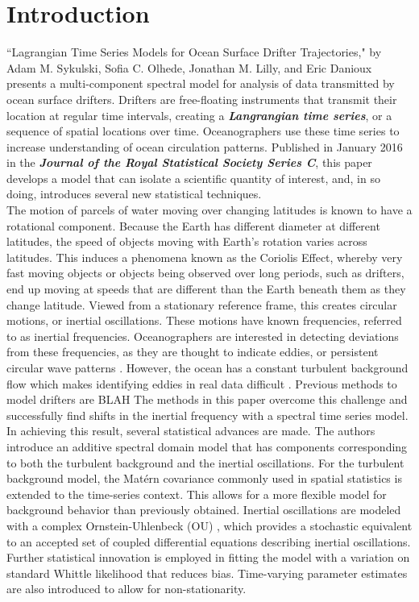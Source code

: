\documentclass{stat572Style}
\begin{document}
\section{Introduction}
\indent ``Lagrangian Time Series Models for Ocean Surface Drifter Trajectories," by Adam M. Sykulski, Sofia C. Olhede, Jonathan M. Lilly, and Eric Danioux presents a multi-component spectral model for analysis of data transmitted by ocean surface drifters. Drifters are free-floating  instruments that transmit their location at regular time intervals,  creating a \textbf{\it{Langrangian time series}}, or a sequence of spatial locations over time. Oceanographers use these time series to increase understanding of  ocean circulation patterns. Published in January 2016 in the \textbf{\it{Journal of the Royal Statistical Society Series C}}, this paper develops a model that can isolate a scientific quantity of interest,  and, in so doing, introduces several new statistical techniques.\\
\indent The motion of parcels of water moving over changing latitudes is known to have a rotational component. Because the Earth has  different diameter at different latitudes, the speed of objects moving with Earth's rotation varies across latitudes.  This induces a phenomena known as the Coriolis Effect, whereby very fast moving objects or objects being observed over long periods, such as drifters, end up moving at speeds that are different than the Earth beneath them as they change latitude. Viewed from a stationary reference frame, this creates circular motions, or inertial oscillations. These motions have known frequencies, referred to as inertial frequencies. Oceanographers  are interested in detecting deviations from these frequencies, as they are thought to indicate eddies, or persistent circular wave patterns \citep{Kunze1985}. However, the ocean has a constant turbulent background flow which makes identifying eddies in real data difficult \citep{ Elipot2010}. Previous methods to model drifters are BLAH The methods in this paper overcome this challenge and successfully find shifts in the inertial frequency with a spectral time series model. \\
\indent In achieving this result, several statistical advances are made.  The authors introduce an additive spectral domain model that has components corresponding to both the turbulent background and the inertial oscillations. For the turbulent background model, the Mat\'{e}rn covariance commonly used in spatial statistics \citep{Gneiting2012} is extended to the time-series context. This allows for a more flexible model for background behavior than previously obtained.  Inertial oscillations are modeled with a complex Ornstein-Uhlenbeck (OU) \citep{Arato1962, Jeffreys1968}, which provides a stochastic equivalent to an accepted set of coupled differential equations describing inertial oscillations. Further statistical innovation is employed in fitting the model with a variation on standard Whittle likelihood that reduces bias. Time-varying parameter estimates are also introduced to allow for non-stationarity.  \\
\end{document}
